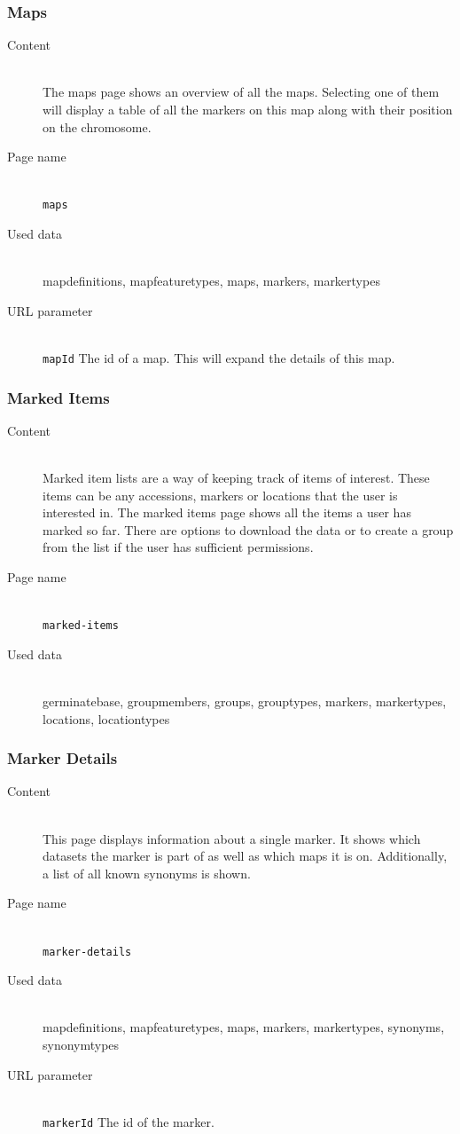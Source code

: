 \subsubsection{Maps}
\begin{description}
	\item[Content]\hfill\\The maps page shows an overview of all the maps. Selecting one of them will display a table of all the markers on this map along with their position on the chromosome.
	\item[Page name]\hfill\\\texttt{maps}
	\item[Used data]\hfill\\mapdefinitions, mapfeaturetypes, maps, markers, markertypes
	\item[URL parameter]\hfill\\\texttt{mapId} The id of a map. This will expand the details of this map.
\end{description}

\subsubsection{Marked Items}
\begin{description}
	\item[Content]\hfill\\Marked item lists are a way of keeping track of items of interest. These items can be any accessions, markers or locations that the user is interested in. The marked items page shows all the items a user has marked so far. There are options to download the data or to create a group from the list if the user has sufficient permissions.
	\item[Page name]\hfill\\\texttt{marked-items}
	\item[Used data]\hfill\\germinatebase, groupmembers, groups, grouptypes, markers, markertypes, locations, locationtypes
\end{description}

\subsubsection{Marker Details}
\begin{description}
	\item[Content]\hfill\\This page displays information about a single marker. It shows which datasets the marker is part of as well as which maps it is on. Additionally, a list of all known synonyms is shown.
	\item[Page name]\hfill\\\texttt{marker-details}
	\item[Used data]\hfill\\mapdefinitions, mapfeaturetypes, maps, markers, markertypes, synonyms, synonymtypes
	\item[URL parameter]\hfill\\\texttt{markerId} The id of the marker.
\end{description}

